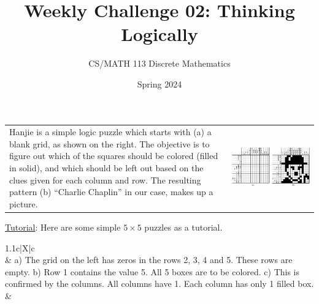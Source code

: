 \documentclass[a4paper]{exam}
\title{Weekly Challenge 02: Thinking Logically}
\author{CS/MATH 113 Discrete Mathematics}
\date{Spring 2024}
\begin{document}
\maketitle

\begin{questions}
  
  
  \begin{tabularx}{\linewidth}{Xc}
    Hanjie is a simple logic puzzle which starts with (a) a blank grid, as shown on the right. The objective is to figure out which of the squares should be colored (filled in solid), and which should be left out based on the clues given for each column and row. The resulting pattern (b) “Charlie Chaplin” in our case, makes up a picture.
    &
    \includegraphics[width=.55\textwidth,align=t]{teaser}
  \end{tabularx}
  \smallskip

  \underline{Tutorial}: Here are some simple $5\times5$ puzzles as a tutorial.
  \smallskip

  \hspace{-15pt} \begin{tabularx}{1.1\linewidth}{c|X|c}
    \\
    &
    {\footnotesize
      a) The grid on the left has zeros in the rows 2, 3, 4 and 5. These rows are empty.\newline
      b) Row 1 contains the value 5. All 5 boxes are to be colored.\newline
      c) This is confirmed by the columns. All columns have 1. Each column has only 1 filled box.}
    &
\end{tabularx}
\end{questions}
\end{document}

